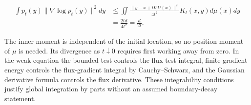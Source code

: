 \documentclass[11pt,a4paper]{report}
\begin{document}
\[\begin{aligned}
\int p_t(y)\|\nabla\log p_t(y)\|^2dy
&\le\iint\frac{\|y-x+t\nabla U(x)\|^2}{4t^2}
K_t(x,y)d\mu(x)dy\\
&=\frac{2td}{4t^2}=\frac d{2t}.
\end{aligned}\]

The inner moment is independent of the initial location, so no position moment of \(\mu\) is needed. Its divergence as \(t\downarrow0\) requires first working away from zero. In the weak equation the bounded test controls the flux-test integral, finite gradient energy controls the flux-gradient integral by Cauchy–Schwarz, and the Gaussian derivative formula controls the flux derivative. These integrability conditions justify global integration by parts without an assumed boundary-decay statement.
\end{document}
